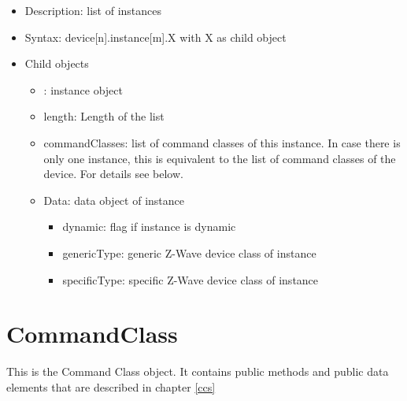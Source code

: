 \begin {itemize}
\item Description: list of instances
\item Syntax:  device[n].instance[m].X with  X as child object
\item Child objects
\begin {itemize}
\item [m]: instance object
\item length: Length of the list
\item commandClasses: list of command classes of this instance. In case there is only one instance, this is equivalent to the list of command classes of the device. For details see below.
\item Data: data object of instance 
\begin {itemize}
\item dynamic: flag if instance is dynamic
\item genericType: generic Z-Wave device class of instance
\item specificType: specific Z-Wave device class of instance
\end {itemize}
\end {itemize}
\end {itemize}

\section{CommandClass}

This is the Command Class object. It contains public methods and public data elements that are described
in chapter \ref{ccs}

